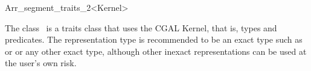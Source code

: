 
\ccRefPageBegin


\begin{ccRefClass}{Arr_segment_traits_2<Kernel>}

\ccDefinition
   The class \ccRefName\ is
   a traits class that uses the CGAL Kernel, that is, types and predicates.
   The representation type  is recommended to be an
   exact type such as  or
    or any other
   exact type, although other inexact representations can be used at
   the user's own risk.


\ccIsModel
     


\end{ccRefClass} %

\ccRefPageEnd
